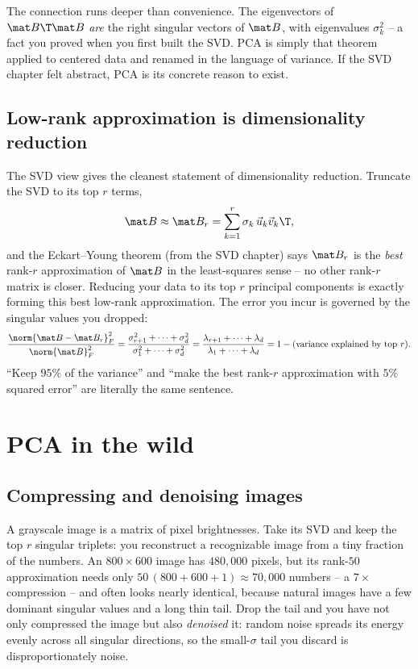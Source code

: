 \begin{remark}
The connection runs deeper than convenience. The eigenvectors of $\mat B\T\mat B$
\emph{are} the right singular vectors of $\mat B$, with eigenvalues $\sigma_k^2$ --
a fact you proved when you first built the SVD. PCA is simply that theorem applied
to centered data and renamed in the language of variance. If the SVD chapter felt
abstract, PCA is its concrete reason to exist.
\end{remark}

\subsection{Low-rank approximation is dimensionality reduction}

The SVD view gives the cleanest statement of dimensionality reduction. Truncate the
SVD to its top $r$ terms,
\[
  \mat B \approx \mat B_r=\sum_{k=1}^r \sigma_k\,\vec u_k\vec v_k\T ,
\]
and the Eckart--Young theorem (from the SVD chapter) says $\mat B_r$ is the
\emph{best} rank-$r$ approximation of $\mat B$ in the least-squares sense -- no
other rank-$r$ matrix is closer. Reducing your data to its top $r$ principal
components is exactly forming this best low-rank approximation. The error you incur
is governed by the singular values you dropped:
\[
  \frac{\norm{\mat B-\mat B_r}_F^2}{\norm{\mat B}_F^2}
  =\frac{\sigma_{r+1}^2+\cdots+\sigma_d^2}{\sigma_1^2+\cdots+\sigma_d^2}
  =\frac{\lambda_{r+1}+\cdots+\lambda_d}{\lambda_1+\cdots+\lambda_d}
  =1-(\text{variance explained by top }r).
\]
``Keep $95\%$ of the variance'' and ``make the best rank-$r$ approximation with
$5\%$ squared error'' are literally the same sentence.

\section{PCA in the wild}

\subsection{Compressing and denoising images}

A grayscale image is a matrix of pixel brightnesses. Take its SVD and keep the top
$r$ singular triplets: you reconstruct a recognizable image from a tiny fraction of
the numbers. An $800\times600$ image has $480{,}000$ pixels, but its rank-$50$
approximation needs only $50\,(800+600+1)\approx 70{,}000$ numbers -- a $7{\times}$
compression -- and often looks nearly identical, because natural images have a few
dominant singular values and a long thin tail. Drop the tail and you have not only
compressed the image but also \emph{denoised} it: random noise spreads its energy
evenly across all singular directions, so the small-$\sigma$ tail you discard is
disproportionately noise.


